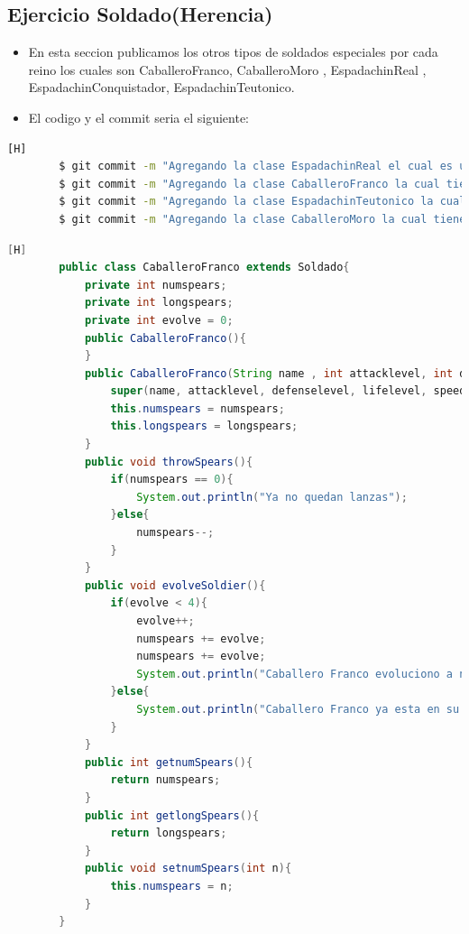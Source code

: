 \documentclass{article}
\begin{document}
	\subsection{Ejercicio Soldado(Herencia)}
	\begin{itemize}	
		\item En esta seccion publicamos los otros tipos de soldados especiales por cada reino los cuales son CaballeroFranco, CaballeroMoro , EspadachinReal , EspadachinConquistador, EspadachinTeutonico.
		\item El codigo y el commit seria el siguiente:
	\end{itemize}	
	\begin{lstlisting}[language=bash,caption={Commit}][H]
		$ git commit -m "Agregando la clase EspadachinReal el cual es una unidad especial para el reino de inglaterra creamos sus metodos y sus atributos necesarios"
		$ git commit -m "Agregando la clase CaballeroFranco la cual tiene sus metodos , getters y setters, y sus debidos atributos"
		$ git commit -m "Agregando la clase EspadachinTeutonico la cual tiene sus metodos como el modoTortuga() y otros, getters y setters, y sus debidos atributos"
		$ git commit -m "Agregando la clase CaballeroMoro la cual tiene sus metodos, getters y setters, y sus debidos atributos"
	\end{lstlisting}	
	\begin{lstlisting}[language=java,caption={Las lineas de codigos de la clase CaballeroFranco:}][H]
		public class CaballeroFranco extends Soldado{
			private int numspears;
			private int longspears;
			private int evolve = 0;
			public CaballeroFranco(){
			}
			public CaballeroFranco(String name , int attacklevel, int defenselevel, int lifelevel, int speed, String attitude ,boolean lives, int row, String column,int numspears, int longspears){
				super(name, attacklevel, defenselevel, lifelevel, speed, attitude, lives, row, column);
				this.numspears = numspears;
				this.longspears = longspears;
			}
			public void throwSpears(){
				if(numspears == 0){
					System.out.println("Ya no quedan lanzas");
				}else{
					numspears--;
				}
			}
			public void evolveSoldier(){
				if(evolve < 4){
					evolve++;
					numspears += evolve;
					numspears += evolve;
					System.out.println("Caballero Franco evoluciono a nivel " + evolve);
				}else{
					System.out.println("Caballero Franco ya esta en su nivel maximo de evolucion.");
				}
			}
			public int getnumSpears(){
				return numspears;
			}
			public int getlongSpears(){
				return longspears;
			}
			public void setnumSpears(int n){
				this.numspears = n;
			}
		}
	\end{lstlisting}
\end{document}
